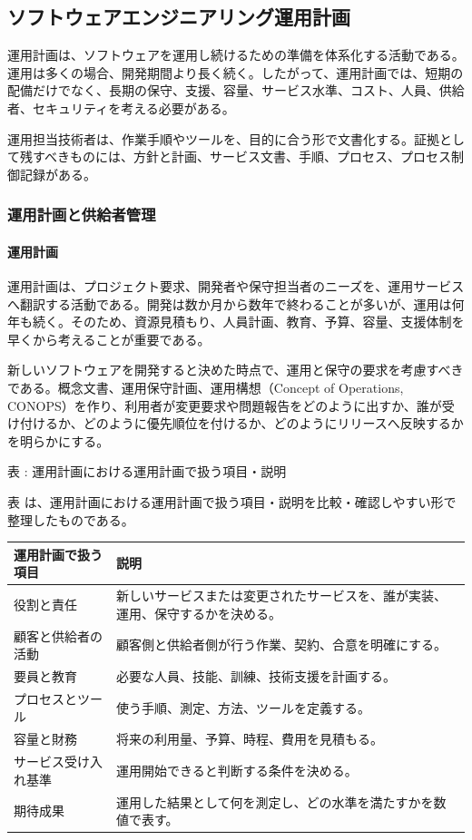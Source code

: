 \subsection{ソフトウェアエンジニアリング運用計画}

運用計画は、ソフトウェアを運用し続けるための準備を体系化する活動である。運用は多くの場合、開発期間より長く続く。したがって、運用計画では、短期の配備だけでなく、長期の保守、支援、容量、サービス水準、コスト、人員、供給者、セキュリティを考える必要がある。

運用担当技術者は、作業手順やツールを、目的に合う形で文書化する。証拠として残すべきものには、方針と計画、サービス文書、手順、プロセス、プロセス制御記録がある。

\subsubsection{運用計画と供給者管理}

\paragraph{運用計画}

運用計画は、プロジェクト要求、開発者や保守担当者のニーズを、運用サービスへ翻訳する活動である。開発は数か月から数年で終わることが多いが、運用は何年も続く。そのため、資源見積もり、人員計画、教育、予算、容量、支援体制を早くから考えることが重要である。

新しいソフトウェアを開発すると決めた時点で、運用と保守の要求を考慮すべきである。概念文書、運用保守計画、運用構想（Concept of Operations, CONOPS）を作り、利用者が変更要求や問題報告をどのように出すか、誰が受け付けるか、どのように優先順位を付けるか、どのようにリリースへ反映するかを明らかにする。

\par\smallskip\noindent{}\label{tab:ch06-04}表 \thetable: 運用計画における運用計画で扱う項目・説明\par\smallskip
表 \thetable は、運用計画における運用計画で扱う項目・説明を比較・確認しやすい形で整理したものである。\par\smallskip
\begin{longtable}{L{45mm}L{105mm}}
\toprule
運用計画で扱う項目 & 説明 \\
\midrule
役割と責任 & 新しいサービスまたは変更されたサービスを、誰が実装、運用、保守するかを決める。 \\
顧客と供給者の活動 & 顧客側と供給者側が行う作業、契約、合意を明確にする。 \\
要員と教育 & 必要な人員、技能、訓練、技術支援を計画する。 \\
プロセスとツール & 使う手順、測定、方法、ツールを定義する。 \\
容量と財務 & 将来の利用量、予算、時程、費用を見積もる。 \\
サービス受け入れ基準 & 運用開始できると判断する条件を決める。 \\
期待成果 & 運用した結果として何を測定し、どの水準を満たすかを数値で表す。 \\
\bottomrule
\end{longtable}

